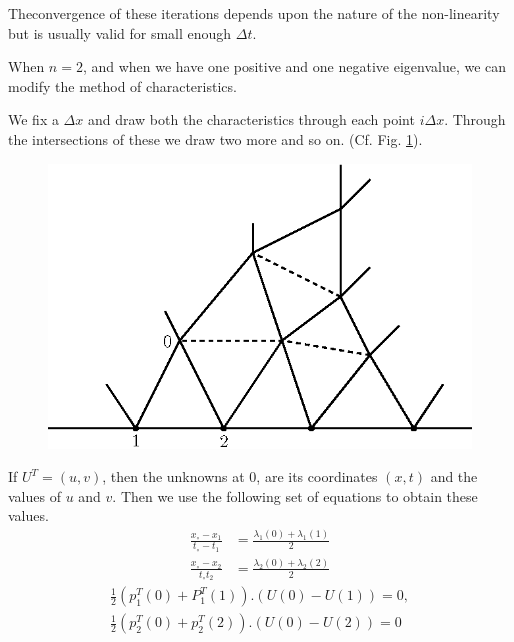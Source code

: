 The\pageoriginale convergence of these iterations depends upon the nature of the non-linearity but is usually valid for small enough $\Delta t$. 

\begin{remark}\label{chap8:rem8.7}
When $n=2$, and when we have one positive and one negative eigenvalue, we can modify the method of characteristics.
\end{remark}

We fix a $\Delta x$ and draw both the characteristics through  each
point $i\Delta x$. Through the intersections of these we draw two more
and so on. (Cf. Fig. \ref{c8:fig8.9}). 

\begin{figure}[H]
\centering
\includegraphics{figures/fig52-8.9.eps}
\caption{}\label{c8:fig8.9}
\end{figure}

If $U^T = (u,v)$, then the unknowns at $0$, are its coordinates $(x,t)$ and the values of $u$ and $v$. Then we use the following set of equations to obtain these values. 
\begin{align*}
\frac{x_\circ - x_1}{t_\circ - t_1} & = \frac{\lambda_1 (0) + \lambda_1(1)}{2} \tag{8.59}\label{eq8.59} \\
\frac{x_\circ - x_2}{t_\circ t_2} & = \frac{\lambda_2 (0) + \lambda_2 (2)}{2}  \tag{8.60} \label{eq8.60}
\end{align*}
\begin{align*}
\frac{1}{2} (p^T_1(0)  + P^T_1(1)). (U(0) - U(1)) = 0,
\tag{8.61}\label{eq8.61}\\ 
\frac{1}{2} (p^T_2 (0) + p^T_2 (2)). (U(0) - U(2)) = 0
\tag{8.62}\label{eq8.62} 
\end{align*}

